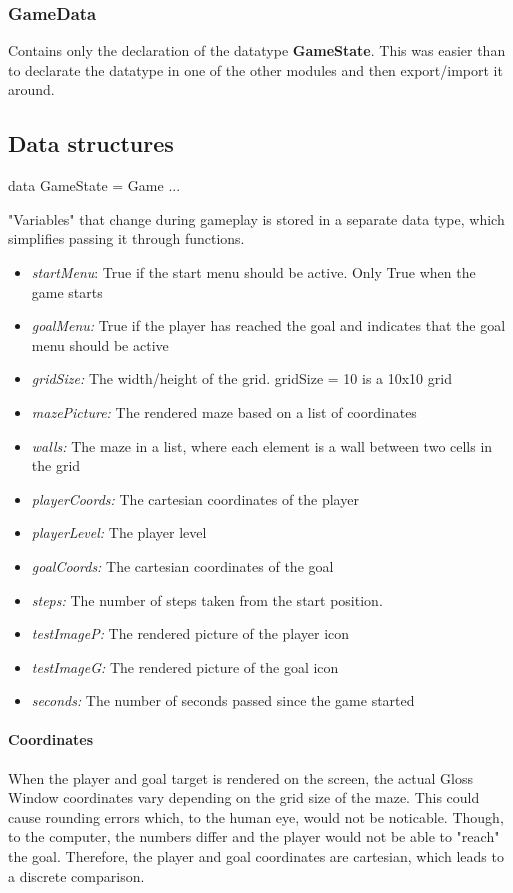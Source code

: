 \documentclass[12pt, a4paper]{article}
\begin{document}
\subsubsection*{GameData}
Contains only the declaration of the datatype \textbf{GameState}. This was easier than to declarate the datatype in one of the other modules and then export/import it around.   

\subsection{Data structures}

\begin{code}
data GameState = Game { ... }
\end{code}
"Variables" that change during gameplay is stored in a separate data type, which simplifies passing it through functions.
\begin{itemize}
    \item \textit{startMenu}: True if the start menu should be active. Only True when the game starts
    \item \textit{goalMenu:} True if the player has reached the goal and indicates that the goal menu should be active
    \item \textit{gridSize:} The width/height of the grid. gridSize = 10 is a 10x10 grid
    \item \textit{mazePicture:} The rendered maze based on a list of coordinates
    \item \textit{walls:} The maze in a list, where each element is a wall between two cells in the grid
    \item \textit{playerCoords:} The cartesian coordinates of the player
    \item \textit{playerLevel:} The player level
    \item \textit{goalCoords:} The cartesian coordinates of the goal
    \item \textit{steps:} The number of steps taken from the start position.
    \item \textit{testImageP:} The rendered picture of the player icon
    \item \textit{testImageG:} The rendered picture of the goal icon
    \item \textit{seconds:} The number of seconds passed since the game started
\end{itemize}

\paragraph{Coordinates}
When the player and goal target is rendered on the screen, the actual Gloss Window coordinates vary depending on the grid size of the maze. This could cause rounding errors which, to the human eye, would not be noticable. Though, to the computer, the numbers differ and the player would not be able to "reach" the goal. Therefore, the player and goal coordinates are cartesian, which leads to a discrete comparison.
\end{document}
